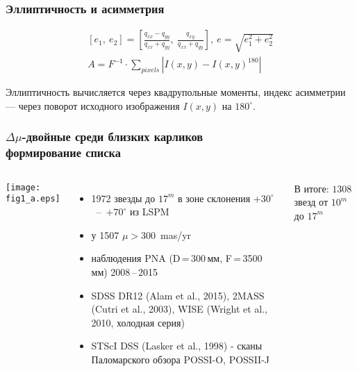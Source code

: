 \begin{frame}
\frametitle{Эллиптичность и асимметрия}
\begin{center}
{\small
\begin{align*}

\left[e_1,~e_2\right] = \left[\frac{q_{xx}-q_{yy}}{q_{xx}+q_{yy}},~\frac{q_{xy}}{q_{xx}+q_{yy}}\right],\: e = \sqrt{e_1^2+e_2^2}\\[15pt]
A = F^{-1}\cdot \sum_{pixels} |I(x,y)-I(x,y)^{180}|

\end{align*}
}
\end{center}
{\footnotesize
	Эллиптичность вычисляется через квадрупольные моменты, индекс асимметрии --- через поворот исходного изображения $I(x,y)$ на $180^\circ$.
}
\end{frame}

\begin{frame}%
\frametitle{$\Delta\mu$-двойные среди близких карликов\\{\small формирование списка}}
\begin{columns}
	\texttt{[image: fig1\_a.eps]}
{\scriptsize 
\begin{itemize}
\item[] 1972 звезды до $17^m$ в зоне склонения $+30^{\circ}$~--~$+70^{\circ}$ из LSPM\\[10pt]
\item[] у 1507 $\mu > 300$~mas/yr\\[10pt]
\item[] наблюдения PNA (D\,=\,300\,мм, F\,=\,3500\,мм) 2008\,--\,2015\\[10pt]
\item[] SDSS DR12 (Alam et al., 2015), 2MASS (Cutri et al., 2003), WISE (Wright et al., 2010, холодная серия)\\[10pt]
\item[]STScI DSS (Lasker et al., 1998) - сканы Паломарского обзора POSSI-O, POSSII-J\\[10pt]
\end{itemize}
В итоге: $1308$ звезд от $10^m$ до $17^m$
}
\end{columns}
\end{frame}

